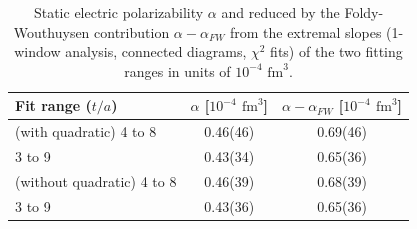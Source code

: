 \begin{table}[H]
\begin{center}
    \begin{tabular}{ | l | c | c | }
    \hline
     Fit range ($t/a$) & $\alpha$ [$10^{-4}$ $\text{fm}^3$]    & $\alpha-\alpha_{FW}$ [$10^{-4}$ $\text{fm}^3$]       \\ 
     \hline
        (with quadratic) 4 to 8&   0.46(46)       &    0.69(46)          \\ \hline
     3 to 9 &  0.43(34)        &     0.65(36)          \\ \hline\hline
 (without quadratic) 4 to 8 &   0.46(39)       &    0.68(39)          \\ \hline
     3 to 9 &   0.43(36)        &     0.65(36)          \\ \hline
    \end{tabular}
\end{center}
\caption{Static electric polarizability  $\alpha$ and reduced by the Foldy-Wouthuysen contribution $\alpha-\alpha_{FW}$ from the extremal slopes (1-window analysis, connected diagrams, $\chi^2$ fits) of the two fitting ranges in units of $10^{-4}$ $\text{fm}^3$. }
\label{tab:1wElectricPolarizabilityConn}
\end{table}
